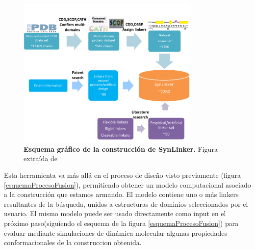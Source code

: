 \begin{figure}[ht]
\centering
\includegraphics[width=0.8\textwidth]{img/synLink.png} 
\caption{\textbf{Esquema gráfico de la construcción de SynLinker.} Figura extraída de \cite{liu2015synlinker}} 
\label{SynLinker}
\end{figure}


Esta herramienta va más allá en el proceso de diseño visto previamente (figura \ref{esquemaProcesoFusion}), permitiendo obtener un modelo computacional asociado a la construcción que estamos armando. 
El modelo contiene uno o más linkers resultantes de la búsqueda, unidos a estructuras de dominios seleccionados por el usuario.
El mismo modelo puede ser usado directamente como input en el próximo paso(siguiendo el esquema de la figura \ref{esquemaProcesoFusion}) para evaluar mediante simulaciones 
de dinámica molecular algunas propiedades conformacionales de la construccion obtenida.


